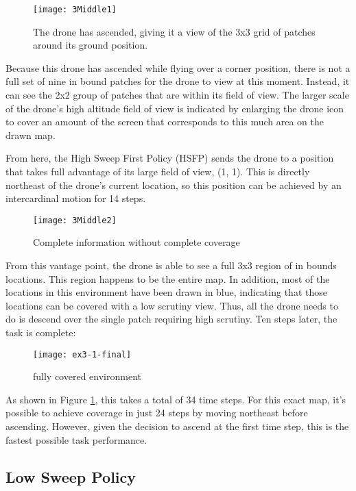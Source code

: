 \begin{figure}[H]
\texttt{[image: 3Middle1]}
\caption[Partially Explored Environment]{The drone has ascended, giving it a view of the 3x3 grid of patches around its ground position.}
\end{figure}

Because this drone has ascended while flying over a corner position, there is not a full set of nine in bound patches for the drone to view at this moment. Instead, it can see the 2x2 group of patches that are within its field of view. The larger scale of the drone's high altitude field of view is indicated by enlarging the drone icon to cover an amount of the screen that corresponds to this much area on the drawn map.

From here, the High Sweep First Policy (HSFP) sends the drone to a position that takes full advantage of its large field of view, (1, 1). This is directly northeast of the drone's current location, so this position can be achieved by an intercardinal motion for 14 steps.

\begin{figure}[H]
\texttt{[image: 3Middle2]}
\caption[Complete information without complete coverage]{Complete information without complete coverage}
\end{figure}

From this vantage point, the drone is able to see a full 3x3 region of in bounds locations. This region happens to be the entire map. In addition, most of the locations in this environment have been drawn in blue, indicating that those locations can be covered with a low scrutiny view. Thus, all the drone needs to do is descend over the single patch requiring high scrutiny. Ten steps later, the task is complete:

\begin{figure}[H]
\texttt{[image: ex3-1-final]}
\caption[Fully Covered Environment]{fully covered environment}
\label{fig:3-1-end}
\end{figure}

As shown in Figure \ref{fig:3-1-end}, this takes a total of 34 time steps. For this exact map, it's possible to achieve coverage in just 24 steps by moving northeast before ascending. However, given the decision to ascend at the first time step, this is the fastest possible task performance.

\subsection{Low Sweep Policy}

